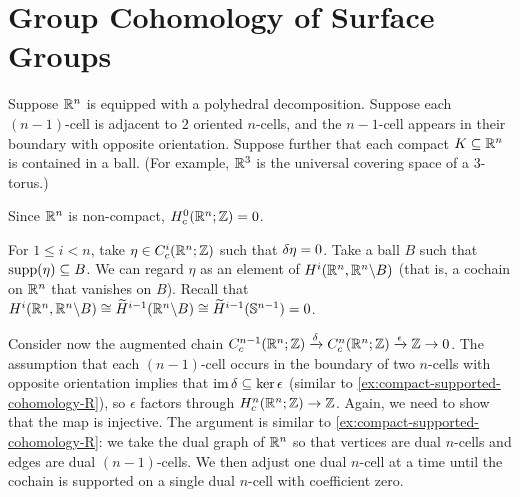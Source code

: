 \section{Group Cohomology of Surface Groups}
\label{sec:L04-W02D2}

\begin{example}
    \label{ex:compact-supported-cohomology-Rn}
    Suppose \(\mathbb{R}^n\) is equipped with a polyhedral decomposition. 
    Suppose each \((n-1)\)-cell is adjacent to \(2\) oriented \(n\)-cells, and the \(n-1\)-cell appears in their boundary with opposite orientation. 
    Suppose further that each compact \(K\subseteq \mathbb{R}^n\) is contained in a ball. (For example,  \(\mathbb{R}^3\) is the universal covering space of a \(3\)-torus.)

    Since \(\mathbb{R}^n\) is non-compact, \(H_c^0(\mathbb{R}^n;\mathbb{Z})=0\).

    For \(1\leq i <n\), take \(\eta \in C_c^i(\mathbb{R}^n;\mathbb{Z})\) such that \(\delta\eta=0\). Take a ball \(B\) such that \( \operatorname{supp}({\eta}) \subseteq B \). We can regard \(\eta\) as an element of \(H^i(\mathbb{R}^n,\mathbb{R}^n\backslash B)\) (that is, a cochain on \(\mathbb{R}^n\) that vanishes on \(B\)). Recall that \(H^i(\mathbb{R}^n,\mathbb{R}^n\backslash B) \cong \widetilde H^{i-1}(\mathbb{R}^n\backslash B) \cong \widetilde H^{i-1}(\mathbb{S}^{n-1}) =0 \).

    Consider now the augmented chain \(C_c^{n-1}(\mathbb{R}^n;\mathbb{Z}) \xrightarrow{\delta} C_c^n(\mathbb{R}^n;\mathbb{Z}) \xrightarrow{\epsilon} \mathbb{Z} \to 0\). The assumption that each \((n-1)\)-cell occurs in the boundary of two \(n\)-cells with opposite orientation implies that \(\operatorname{im} \delta \subseteq \ker \epsilon\) (similar to \cref{ex:compact-supported-cohomology-R}), so \(\epsilon\) factors through \(H_c^n(\mathbb{R}^n;\mathbb{Z}) \to \mathbb{Z}\). Again, we need to show that the map is injective. The argument is similar to \cref{ex:compact-supported-cohomology-R}: we take the dual graph of \(\mathbb{R}^n\) so that vertices are dual \(n\)-cells and edges are dual \((n-1)\)-cells. We then adjust one dual \(n\)-cell at a time until the cochain is supported on a single dual \(n\)-cell with coefficient zero.
\end{example}

